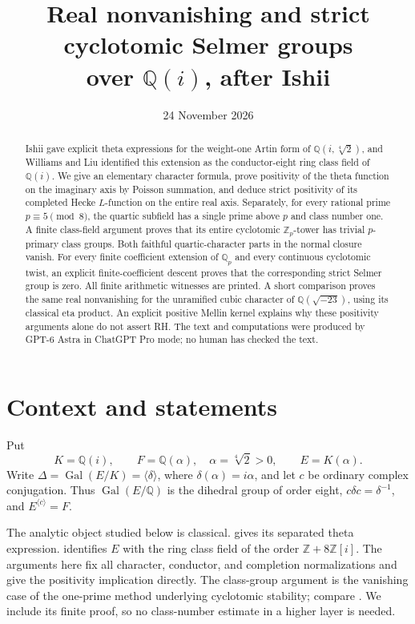\documentclass[11pt]{article}
\title{Real nonvanishing and strict cyclotomic Selmer groups\\over $\mathbb Q(i)$, after Ishii}
\author{}
\date{24 November 2026}
\newcommand{\Q}{\mathbb Q}
\newcommand{\Z}{\mathbb Z}
\newcommand{\Gal}{\operatorname{Gal}}
\begin{document}
\maketitle

\begin{abstract}
Ishii gave explicit theta expressions for the weight-one Artin form of
$\mathbb Q(i,\sqrt[4]{2})$, and Williams and Liu identified this extension
as the conductor-eight ring class field of $\mathbb Q(i)$.
We give an elementary character formula, prove positivity of the theta
function on the imaginary axis by Poisson summation, and deduce strict
positivity of its completed Hecke $L$-function on the entire real axis.
Separately, for every rational prime $p\equiv5\pmod8$, the quartic
subfield has a single prime above $p$ and class number one. A finite
class-field argument proves that its entire cyclotomic $\Z_p$-tower has
trivial $p$-primary class groups. Both faithful quartic-character parts
in the normal closure vanish. For every finite coefficient extension of
$\Q_p$ and every continuous cyclotomic twist, an explicit
finite-coefficient descent proves that the corresponding strict Selmer
group is zero. All finite arithmetic witnesses are printed.
A short comparison proves the same real nonvanishing for the
unramified cubic character of $\mathbb Q(\sqrt{-23})$, using its classical
eta product. An explicit positive Mellin kernel explains why these
positivity arguments alone do not assert RH.
The text and computations were produced by GPT-6 Astra in ChatGPT Pro mode;
no human has checked the text.
\end{abstract}

\section{Context and statements}

Put
\[
 K=\Q(i),\qquad F=\Q(\alpha),\quad \alpha=\sqrt[4]{2}>0,
 \qquad E=K(\alpha).
\]
Write $\Delta=\Gal(E/K)=\langle\delta\rangle$, where
$\delta(\alpha)=i\alpha$, and let $c$ be ordinary complex conjugation.
Thus $\Gal(E/\Q)$ is the dihedral group of order eight,
$c\delta c=\delta^{-1}$, and $E^{\langle c\rangle}=F$.

The analytic object studied below is classical.
\citet[\S2, Remark~1, p.~127]{Ishii1985} gives its separated theta
expression. \citet[Lemma~3.8, p.~332]{WilliamsLiu1994} identifies $E$ with
the ring class field of the order $\Z+8\Z[i]$.
The arguments here fix all character, conductor, and completion
normalizations and give the positivity implication directly.
The class-group argument is the vanishing case of the one-prime method
underlying cyclotomic stability; compare
\citet[Theorem~1(1), p.~264]{Fukuda1994}.
We include its finite proof, so no class-number estimate in a higher
layer is needed.
\end{document}
